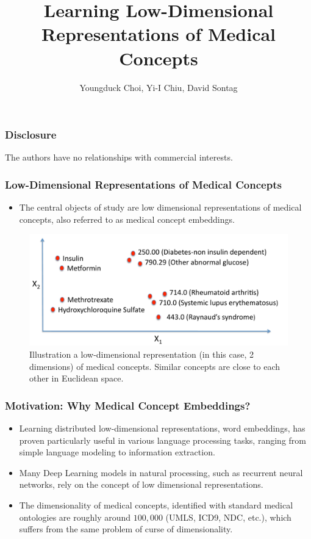 \documentclass{beamer}
\title[LLDRMC]{Learning Low-Dimensional Representations
of Medical Concepts \\
}
\author[Choi et al.]
{Youngduck Choi, Yi-I Chiu, David Sontag }
\institute[CIMS]{Courant Institute of Mathematical 
Sciences, New York University}
\begin{document}
 
\frame{\titlepage} 

\begin{frame}
\frametitle{Disclosure}
\begin{center}
The authors have no relationships 
with commercial interests.
\end{center}
\end{frame}

\begin{frame}
\frametitle{Low-Dimensional Representations of 
Medical Concepts}
\begin{center}
\begin{itemize}
\item The central objects of study are
low dimensional representations of medical 
concepts, also referred to as medical concept
embeddings.
\end{itemize}
\bigskip

\begin{figure}[t]
    \centering 
    \includegraphics[width=.6\linewidth]{figs/illustration_of_embeddings.pdf}
    \caption{\centering 
\scriptsize Illustration a low-dimensional representation (in
      this case, 2 dimensions) of medical concepts. Similar concepts are close to each other in Euclidean space.
\label{fig:illustration_of_embeddings}}
\end{figure}
\end{center}
\end{frame}

\begin{frame}
\frametitle{Motivation: Why Medical Concept Embeddings?}
\begin{center}
\begin{itemize}
\item 
Learning distributed low-dimensional representations,
word embeddings, has proven particularly useful
in various language processing tasks, ranging from
simple language modeling to information extraction.

\bigskip

\item Many Deep Learning models in natural processing,
such as recurrent neural networks, 
rely on the concept of 
low dimensional representations.

\bigskip

\item The dimensionality of medical concepts, 
identified with standard medical ontologies are
roughly around $100,000$ (UMLS, ICD9, NDC, etc.),
which 
suffers from the same problem of curse of dimensionality. 

\end{itemize}
\end{center}
\end{frame}
\end{document}
